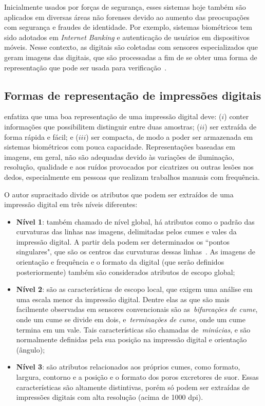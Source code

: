 Inicialmente usados por forças de segurança, esses sistemas hoje também são aplicados em diversas áreas não forenses devido ao aumento das preocupações com segurança e fraudes de identidade. Por exemplo, sistemas biométricos tem sido adotados em \textit{Internet Banking} e autenticação de usuários em dispositivos móveis. Nesse contexto, as digitais são coletadas com sensores especializados que geram imagens das digitais, que são processadas a fim de se obter uma forma de representação que pode ser usada para verificação~\cite{HandbookOfBiometrics}.

\subsection{Formas de representação de impressões digitais}\label{subsec:representacao_de_digitais}

 enfatiza que uma boa representação de uma impressão digital deve: ($i$) conter informações que possibilitem distinguir entre duas amostras; ($ii$) ser extraída de forma rápida e fácil; e ($iii$) ser compacta, de modo a poder ser armazenada em sistemas biométricos com pouca capacidade. Representações baseadas em imagens, em geral, não são adequadas devido às variações de iluminação, resolução, qualidade e aos ruídos provocados por cicatrizes ou outras lesões nos dedos, especialmente em pessoas que realizam trabalhos manuais com frequência.

O autor supracitado divide os atributos que podem ser extraídos de uma impressão digital em três níveis diferentes:
\begin{itemize}
    \item \textbf{Nível 1}: também chamado de nível global, há atributos como o padrão das curvaturas das linhas nas imagens, delimitadas pelos cumes e vales da impressão digital. A partir dela podem ser determinados os ``pontos singulares", que são os centros das curvaturas dessas linhas~\cite{LEVI1972327}. As imagens de orientação e frequência e o formato da digital (que serão definidos posteriormente) também são considerados atributos de escopo global;
    \item \textbf{Nível 2}: são as características de escopo local, que exigem uma análise em uma escala menor da impressão digital. Dentre elas as que são mais facilmente observadas em sensores convencionais são as~\textit{bifurcações de cume}, onde um cume se divide em dois, e~\textit{terminações de cume}, onde um cume termina em um vale. Tais características são chamadas de~\textit{minúcias}, e são normalmente definidas pela sua posição na impressão digital e orientação (ângulo);
    \item \textbf{Nível 3}: são atributos relacionados aos próprios cumes, como formato, largura, contorno e a posição e o formato dos poros excretores de suor. Essas características são altamente distintivas, porém só podem ser extraídas de impressões digitais com alta resolução (acima de 1000 dpi).    
\end{itemize}

